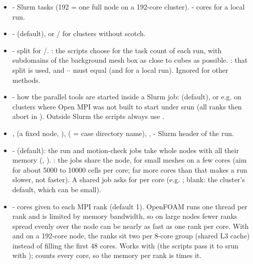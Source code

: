 \begin{itemize}
    \item {} - Slurm tasks (192 = one full node on a 192-core cluster).  - cores for a local run.
    \item {} -  (default), or  /  for clusters without scotch.
    \item {} - split for /. : the scripts choose  for the task count of each run, with subdomains of the background mesh box as close to cubes as possible. : that split is used, and $\cdot$$\cdot$ must equal  (and  for a local run). Ignored for other methods.
    \item {} - how the parallel tools are started inside a Slurm job:  (default), or e.g.  on clusters where Open MPI was not built to start under srun (all ranks then abort in ). Outside Slurm the scripts always use .
    \item {},  (a fixed node, ),  ( = case directory name), ,  - Slurm header of the run.
    \item {} -  (default): the run and motion-check jobs take whole nodes with all their memory (, ). : the jobs share the node, for small meshes on a few cores (aim for about 5000 to 10000 cells per core; far more cores than that makes a run slower, not faster). A shared job asks for  per core (e.g. ; blank: the cluster's default, which can be small).
    \item {} - cores given to each MPI rank (default 1). OpenFOAM runs one thread per rank and is limited by memory bandwidth, so on large nodes fewer ranks spread evenly over the node can be nearly as fast as one rank per core. With  and  on a 192-core node, the ranks sit two per 8-core group (shared L3 cache) instead of filling the first 48 cores. Works with  (the scripts pass it to srun with );  counts every core, so the memory per rank is  times it.

\end{itemize}
